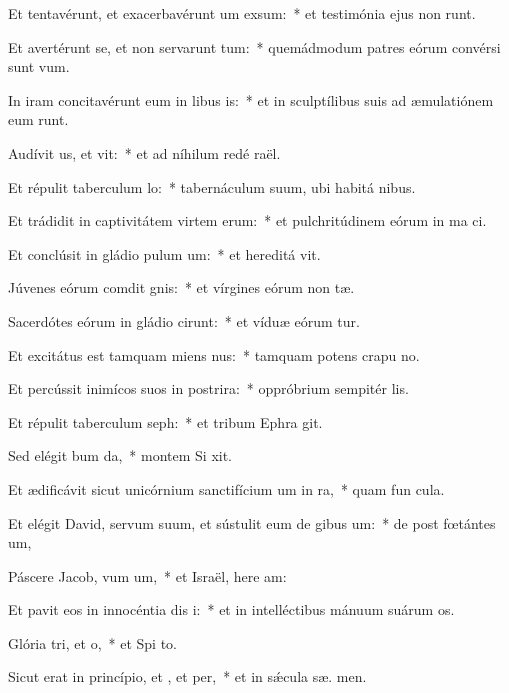 \item Et tentavérunt, et exacerbavérunt um exsum:~* et testimónia ejus non runt.
\item Et avertérunt se, et non servarunt tum:~* quemádmodum patres eórum convérsi sunt   vum.
\item In iram concitavérunt eum in libus is:~* et in sculptílibus suis ad æmulatiónem eum runt.
\item Audívit us, et vit:~* et ad níhilum redé  raël.
\item Et répulit taberculum lo:~* tabernáculum suum, ubi habitá  nibus.
\item Et trádidit in captivitátem virtem erum:~* et pulchritúdinem eórum in ma ci.
\item Et conclúsit in gládio pulum um:~* et hereditá  vit.
\item Júvenes eórum comdit gnis:~* et vírgines eórum non  tæ.
\item Sacerdótes eórum in gládio cirunt:~* et víduæ eórum  tur.
\item Et excitátus est tamquam miens nus:~* tamquam potens crapu  no.
\item Et percússit inimícos suos in postrira:~* oppróbrium sempitér  lis.
\item Et répulit taberculum seph:~* et tribum Ephra  git.
\item Sed elégit bum da,~* montem Si  xit.
\item Et ædificávit sicut unicórnium sanctifícium um in ra,~* quam fun  cula.
\item Et elégit David, servum suum, et sústulit eum de gibus um:~* de post fœtántes  um,
\item Páscere Jacob, vum um,~* et Israël, here am:
\item Et pavit eos in innocéntia dis i:~* et in intelléctibus mánuum suárum  os.
\item Glória tri, et o,~* et Spi to.
\item Sicut erat in princípio, et , et per,~* et in sǽcula sæ. men.
